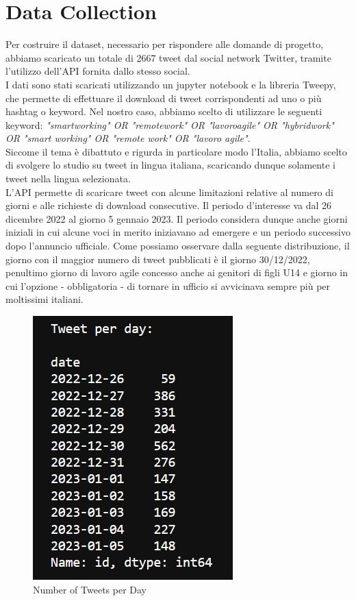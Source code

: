 \documentclass[12pt,journal,compsoc]{IEEEtran}
\begin{document}
\section{Data Collection}
Per costruire il dataset, necessario per rispondere alle domande di progetto, abbiamo scaricato un totale di 2667 tweet dal social network Twitter, tramite l'utilizzo dell'API fornita dallo stesso social.\\
I dati sono stati scaricati utilizzando un jupyter notebook e la libreria Tweepy, che permette di effettuare il download di tweet corrispondenti ad uno o più hashtag o keyword. Nel nostro caso, abbiamo scelto di utilizzare le seguenti keyword: \textit{"smartworking" OR "remotework" OR "lavoroagile" OR "hybridwork" OR "smart working" OR "remote work" OR "lavoro agile"}.\\
Siccome il tema è dibattuto e rigurda in particolare modo l'Italia, abbiamo scelto di svolgere lo studio su tweet in lingua italiana, scaricando dunque solamente i tweet nella lingua selezionata.\\
L'API permette di scaricare tweet con alcune limitazioni relative al numero di giorni e alle richieste di download consecutive. Il periodo d'interesse va dal 26 dicembre 2022 al giorno 5 gennaio 2023. Il periodo considera dunque anche giorni iniziali in cui alcune voci in merito iniziavano ad emergere e un periodo successivo dopo l'annuncio ufficiale. Come possiamo osservare dalla seguente distribuzione, il giorno con il maggior numero di tweet pubblicati è il giorno 30/12/2022, penultimo giorno di lavoro agile concesso anche ai genitori di figli U14 e giorno in cui l'opzione - obbligatoria - di tornare in ufficio si avvicinava sempre più per moltissimi italiani.

\begin{figure}[H]
  \includegraphics[scale=1]{./images/tweetxday.png}
  \caption{Number of Tweets per Day}
\end{figure}
\end{document}
